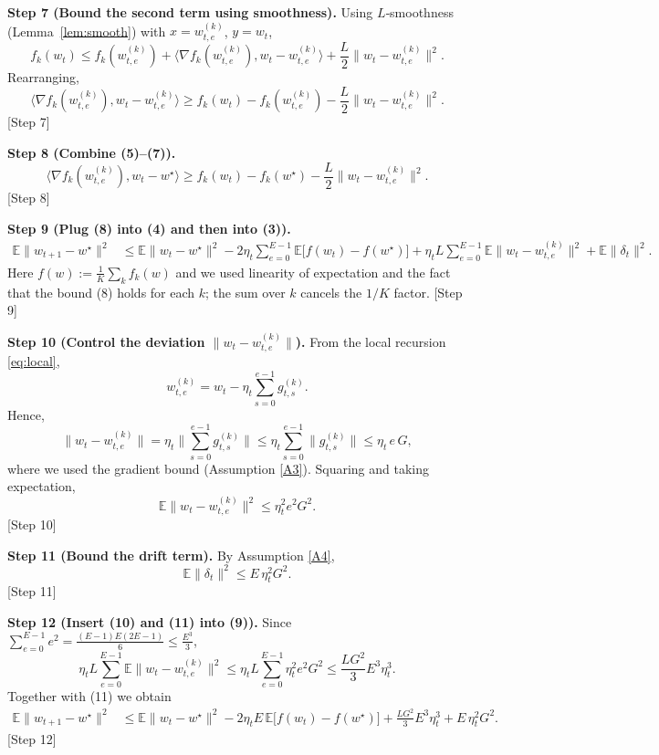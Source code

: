 \documentclass[11pt]{article}
\newcommand{\E}{\mathbb{E}}
\begin{document}
\medskip
\noindent\textbf{Step 7 (Bound the second term using smoothness).}  
Using $L$‑smoothness (Lemma~\ref{lem:smooth}) with $x=w_{t,e}^{(k)}$, $y=w_t$,
\[
f_k(w_t) \le f_k(w_{t,e}^{(k)}) + \langle \nabla f_k(w_{t,e}^{(k)}), w_t-w_{t,e}^{(k)}\rangle
+ \frac{L}{2}\|w_t-w_{t,e}^{(k)}\|^{2}.
\]
Rearranging,
\[
\langle \nabla f_k(w_{t,e}^{(k)}), w_t-w_{t,e}^{(k)}\rangle
\ge f_k(w_t)-f_k(w_{t,e}^{(k)})-\frac{L}{2}\|w_t-w_{t,e}^{(k)}\|^{2}. \tag{7}
\]
[Step 7]

\medskip
\noindent\textbf{Step 8 (Combine (5)–(7)).}
\[
\langle \nabla f_k(w_{t,e}^{(k)}), w_t-w^\star\rangle
\ge f_k(w_t)-f_k(w^\star)-\frac{L}{2}\|w_t-w_{t,e}^{(k)}\|^{2}. \tag{8}
\]
[Step 8]

\medskip
\noindent\textbf{Step 9 (Plug (8) into (4) and then into (3)).}
\begin{align}
\E\|w_{t+1}-w^\star\|^{2}
&\le \E\|w_t-w^\star\|^{2}
-2\eta_t\sum_{e=0}^{E-1}\E\big[ f(w_t)-f(w^\star)\big]
+ \eta_t L\sum_{e=0}^{E-1}\E\|w_t-w_{t,e}^{(k)}\|^{2}
+ \E\|\delta_t\|^{2}. \tag{9}
\end{align}
Here $f(w):=\frac1K\sum_{k}f_k(w)$ and we used linearity of expectation and the fact that the bound (8) holds for each $k$; the sum over $k$ cancels the $1/K$ factor.  
[Step 9]

\medskip
\noindent\textbf{Step 10 (Control the deviation $\|w_t-w_{t,e}^{(k)}\|$).}  
From the local recursion \eqref{eq:local},
\[
w_{t,e}^{(k)} = w_t - \eta_t\sum_{s=0}^{e-1} g_{t,s}^{(k)} .
\]
Hence,
\[
\|w_t-w_{t,e}^{(k)}\|
= \eta_t\Big\|\sum_{s=0}^{e-1} g_{t,s}^{(k)}\Big\|
\le \eta_t\sum_{s=0}^{e-1}\|g_{t,s}^{(k)}\|
\le \eta_t\,e\,G,
\]
where we used the gradient bound (Assumption \ref{A3}). Squaring and taking expectation,
\[
\E\|w_t-w_{t,e}^{(k)}\|^{2}\le \eta_t^{2} e^{2} G^{2}. \tag{10}
\]
[Step 10]

\medskip
\noindent\textbf{Step 11 (Bound the drift term).}  
By Assumption \ref{A4},
\[
\E\|\delta_t\|^{2}\le E\,\eta_t^{2} G^{2}. \tag{11}
\]
[Step 11]

\medskip
\noindent\textbf{Step 12 (Insert (10) and (11) into (9)).}
Since $\sum_{e=0}^{E-1} e^{2}= \frac{(E-1)E(2E-1)}{6}\le \frac{E^{3}}{3}$,
\[
\eta_t L\sum_{e=0}^{E-1}\E\|w_t-w_{t,e}^{(k)}\|^{2}
\le \eta_t L\sum_{e=0}^{E-1}\eta_t^{2} e^{2} G^{2}
\le \frac{L G^{2}}{3}E^{3}\eta_t^{3}. \tag{12}
\]
Together with (11) we obtain
\begin{align}
\E\|w_{t+1}-w^\star\|^{2}
&\le \E\|w_t-w^\star\|^{2}
-2\eta_t E\,\E\big[ f(w_t)-f(w^\star)\big]
+ \frac{L G^{2}}{3}E^{3}\eta_t^{3}
+ E\,\eta_t^{2} G^{2}. \tag{13}
\end{align}
[Step 12]
\end{document}
